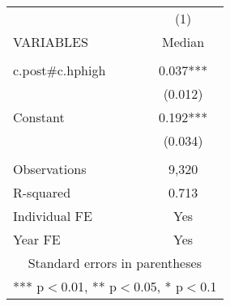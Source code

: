 \begin{tabular}{lc} \hline
 & (1) \\
VARIABLES & Median \\ \hline
 &  \\
c.post\#c.hphigh & 0.037*** \\
 & (0.012) \\
Constant & 0.192*** \\
 & (0.034) \\
 &  \\
Observations & 9,320 \\
R-squared & 0.713 \\
Individual FE & Yes \\
 Year FE & Yes \\ \hline
\multicolumn{2}{c}{ Standard errors in parentheses} \\
\multicolumn{2}{c}{ *** p$<$0.01, ** p$<$0.05, * p$<$0.1} \\
\end{tabular}
